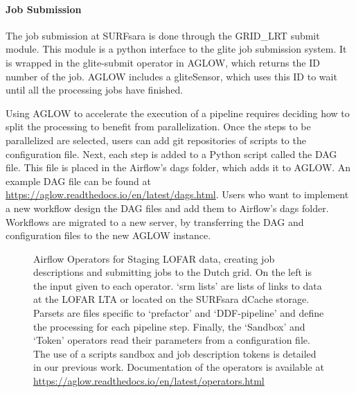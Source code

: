 \paragraph{Job Submission}
The job submission at SURFsara is done through the GRID\_LRT submit module. This module is a python interface to the glite job submission system. It is wrapped in the glite-submit operator in AGLOW, which returns the ID number of the job. AGLOW includes a gliteSensor, which uses this ID to wait until all the processing jobs have finished. 


Using AGLOW to accelerate the execution of a pipeline requires deciding how to split the processing to benefit from parallelization. Once the steps to be parallelized are selected, users can add git repositories of scripts to the configuration file. Next, each step is added to a Python script called the DAG file. This file is placed in the Airflow's dags folder, which adds it to AGLOW. An example DAG file can be found at \url{https://aglow.readthedocs.io/en/latest/dags.html}. Users who want to implement a new workflow design the DAG files and add them to Airflow's dags folder. Workflows are migrated to a new server, by transferring the DAG and configuration files to the new AGLOW instance. 


\begin{figure}[thpb]
 \centering
    \caption[Graphical representation of the Airflow Operators built for AGLOW]{Airflow Operators for Staging LOFAR data, creating job descriptions and submitting jobs to the Dutch grid. On the left is the input given to each operator. `\Gls{srm} lists' are lists of links to data at the LOFAR LTA or located on the SURFsara dCache storage. Parsets are files specific to `prefactor' and `DDF-pipeline' and define the processing for each pipeline step. Finally, the `Sandbox' and `Token' operators read their parameters from a configuration file. The use of a scripts sandbox and job description tokens is detailed in our previous work\cite{mechev17}. Documentation of the operators is available at  \protect\url{https://aglow.readthedocs.io/en/latest/operators.html}}
 \label{AGLOW_Operators}
\end{figure}
 

